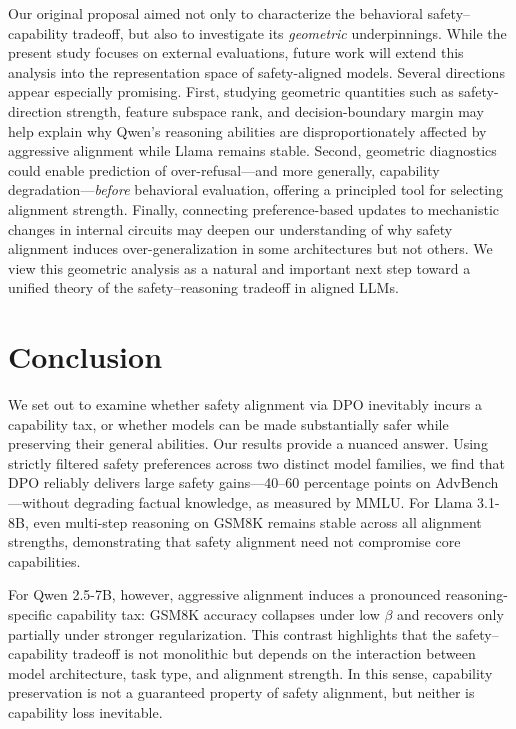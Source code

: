 \documentclass[a4paper, twocolumn, 9pt]{article}
\begin{document}
Our original proposal aimed not only to characterize the behavioral
safety--capability tradeoff, but also to investigate its \emph{geometric}
underpinnings. While the present study focuses on external evaluations,
future work will extend this analysis into the representation space of
safety-aligned models. Several directions appear especially promising.
First, studying geometric quantities such as safety-direction strength,
feature subspace rank, and decision-boundary margin may help explain why
Qwen's reasoning abilities are disproportionately affected by aggressive
alignment while Llama remains stable. Second, geometric diagnostics could
enable prediction of over-refusal---and more generally, capability
degradation---\emph{before} behavioral evaluation, offering a principled tool
for selecting alignment strength. Finally, connecting preference-based
updates to mechanistic changes in internal circuits may deepen our
understanding of why safety alignment induces over-generalization in some
architectures but not others. We view this geometric analysis as a natural
and important next step toward a unified theory of the safety--reasoning
tradeoff in aligned LLMs.


\section{Conclusion}
\label{sec:conclusion}

We set out to examine whether safety alignment via DPO inevitably incurs a capability
tax, or whether models can be made substantially safer while preserving their general
abilities. Our results provide a nuanced answer. Using strictly filtered safety
preferences across two distinct model families, we find that DPO reliably delivers
large safety gains—40--60 percentage points on AdvBench—without degrading factual
knowledge, as measured by MMLU. For Llama 3.1-8B, even multi-step reasoning on GSM8K
remains stable across all alignment strengths, demonstrating that safety alignment
need not compromise core capabilities.

For Qwen 2.5-7B, however, aggressive alignment induces a pronounced reasoning-specific
capability tax: GSM8K accuracy collapses under low $\beta$ and recovers only partially
under stronger regularization. This contrast highlights that the safety--capability
tradeoff is not monolithic but depends on the interaction between model architecture,
task type, and alignment strength. In this sense, capability preservation is not a
guaranteed property of safety alignment, but neither is capability loss inevitable.
\end{document}

